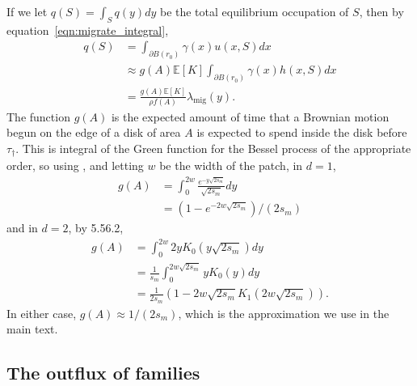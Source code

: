 \documentclass{article}
\newcommand{\E}{\mathbb{E}}
\newcommand{\one}{\mathbf{1}}
\newcommand{\migrate}{\lambda_\text{mig}}
\begin{document}
If we let $q(S) = \int_S q(y) dy$ be the total equilibrium occupation of $S$,
then by equation~\eqref{eqn:migrate_integral},
\begin{align}
    q(S)  &= \int_{\partial B(r_0)} \gamma(x) u(x,S) dx  \\
          &\approx g(A) \E[K] \int_{\partial B(r_0)} \gamma(x) h(x,S) dx \\
          &= \frac{ g(A) \E[K] }{ \rho f(A) } \migrate(y) .
\end{align}
The function $g(A)$ is the expected amount of time that a Brownian motion begun on the edge of a disk of area $A$
is expected to spend inside the disk before $\tau_\dagger$.
This is integral of the Green function for the Bessel process of the appropriate order, 
so using \citet{borodin2002handbook}, %
and letting $w$ be the width of the patch,
in $d=1$,
\begin{align}
    g(A) %
  &= \int_0^{2w} \frac{ e^{- y \sqrt{2s_m} }}{\sqrt{2s_m}} dy \\
  &= (1-e^{-2w\sqrt{2s_m}})/(2s_m)
\end{align}
and in $d=2$, by \citet{gradshteyn2007table} 5.56.2,
\begin{align}
    g(A) %
  &= \int_0^{2w} 2 y K_0(y \sqrt{2s_m}) dy \\
  &= \frac{1}{s_m}\int_0^{2w\sqrt{2s_m}} y K_0(y) dy \\
  &= \frac{1}{2s_m}\left(1- 2w\sqrt{2s_m} K_1(2w\sqrt{2s_m}) \right)  .
\end{align}
In either case, $g(A) \approx 1/(2s_m)$, which is the approximation we use in the main text.




\subsection{The outflux of families}
\label{apx:outflux}
\end{document}
